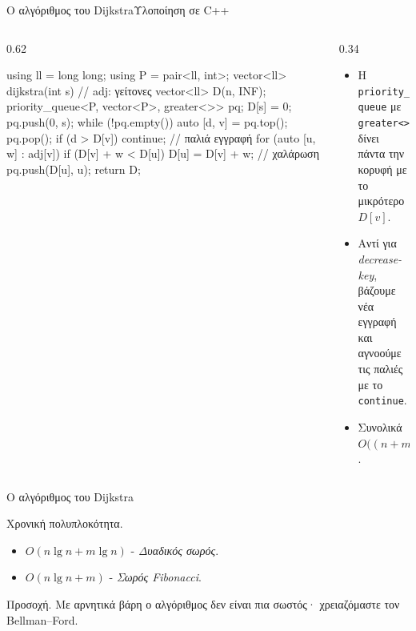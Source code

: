 \documentclass[t,aspectratio=169,9pt]{beamer}
\begin{document}
\begin{frame}[fragile]{Ο αλγόριθμος του Dijkstra}{Υλοποίηση σε C++}
  \begin{columns}[T]
    \begin{column}{0.62\textwidth}
\begin{cpp}
using ll = long long; using P = pair<ll, int>;
vector<ll> dijkstra(int s) {     // adj: γείτονες
  vector<ll> D(n, INF);
  priority_queue<P, vector<P>, greater<>> pq;
  D[s] = 0; pq.push({0, s});
  while (!pq.empty()) {
    auto [d, v] = pq.top(); pq.pop();
    if (d > D[v]) continue;      // παλιά εγγραφή
    for (auto [u, w] : adj[v])
      if (D[v] + w < D[u]) {
        D[u] = D[v] + w;          // χαλάρωση
        pq.push({D[u], u});
      }
  }
  return D;
}
\end{cpp}
    \end{column}
    \begin{column}{0.34\textwidth}
      \pause
      \begin{itemize}
        \item Η \texttt{priority\_queue} με \texttt{greater<>} δίνει πάντα την κορυφή με το μικρότερο $D[v]$.
        \pause
        \item Αντί για \emph{decrease-key}, βάζουμε νέα εγγραφή και αγνοούμε τις παλιές με το \texttt{continue}.
        \pause
        \item Συνολικά $O\bigl((n + m) \lg n\bigr)$.
      \end{itemize}
    \end{column}
  \end{columns}
\end{frame}

\begin{frame}{Ο αλγόριθμος του Dijkstra}
  \begin{block}{Χρονική πολυπλοκότητα.}
    \begin{itemize}
      \item $O(n \lg n + m \lg n)$ - \emph{Δυαδικός σωρός}.
      \item $O(n \lg n + m)$ - \emph{Σωρός Fibonacci}.
    \end{itemize}
  \end{block}
  \pause
  \begin{alertblock}{Προσοχή.}
    \pause %
    Με αρνητικά βάρη ο αλγόριθμος δεν είναι πια σωστός· χρειαζόμαστε τον Bellman--Ford.
  \end{alertblock}
  \pause
  \vspace{0.3cm}
  \begin{center}
  \end{center}
\end{frame}
\end{document}
